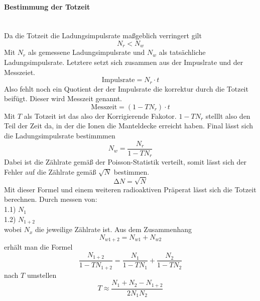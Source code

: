 \paragraph{Bestimmung der Totzeit} 
\label{para:Totzeit}
\mbox{} \\
Da die Totzeit die Ladungsimpulsrate maßgeblich verringert gilt
\begin{equation*}
\label{ref:totzeitverhaeltnis}
N_r < N_w
\end{equation*}
Mit $N_r$ als gemessene Ladungsimpulsrate und $N_w$ als tatsächliche Ladungsimpulsrate. 
Letztere setzt sich zusammen aus der Impuslrate und der Messzeiet.
\begin{equation*}
\text{Impulsrate} = N_r \cdot t
\end{equation*} 
Also fehlt noch ein Quotient der der Impulsrate die korrektur durch die Totzeit beifügt. Dieser wird Messzeit genannt.
\begin{equation*}
\text{Messzeit} = (1-TN_r) \cdot t
\end{equation*}
Mit $T$ als Totzeit ist das also der Korrigierende Fakotor. $1-TN_r$ stelllt also den Teil der Zeit da, in der die Ionen die Manteldecke erreicht haben.
Final lässt sich die Ladungsimpulsrate bestimmmen 
\begin{equation}
\label{ref:Ladungsimpulsrate}
N_w = \frac{N_r}{1-TN_r}
\end{equation}
Dabei ist die Zählrate gemäß der Poisson-Statistik verteilt, somit lässt sich der Fehler auf die Zählrate gemäß $\sqrt{N}$
bestimmen.
\begin{equation}
\label{eqn:fehlerzählrate} %
\increment N = \sqrt{N}
\end{equation}
Mit dieser Formel und einem weiteren radioaktiven Präperat  lässt sich die Totzeit berechnen. 
Durch messen von:\\
1.1)  $N_1$  \\
1.2) $N_{1+2}$\\
wobei $N_x$ die jeweilige Zählrate ist.
Aus dem Zusammenhang 
\begin{equation*}
N_{w1+2} = N_{w1} + N_{w2}
\end{equation*}
erhält man die Formel
\begin{equation*}
\frac{N_{1+2}}{1-TN_{1+2}}=\frac{N_1}{1-TN_1} + \frac{N_2}{1-TN_2}
\end{equation*}
nach $T$ umstellen
\begin{equation}
\label{eqn:totzeit}
T \approx \frac{N_1+N_2-N_{1+2}}{2N_1N_2}
\end{equation}


